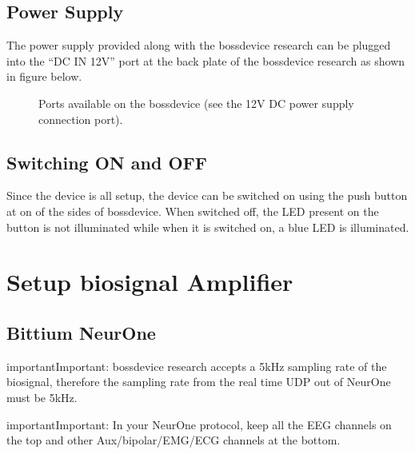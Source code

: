 \documentclass[letterpaper,10pt,english]{sphinxmanual}
\begin{document}
\section{Power Supply}
\label{\detokenize{2_setup_bossdevice_research:power-supply}}
The power supply provided along with the bossdevice research can be plugged into the “DC IN 12V” port at the back plate of the bossdevice research as shown in figure below.

\begin{figure}[htbp]
\centering
\capstart

\noindent{}
\caption{Ports available on the bossdevice (see the 12V DC power supply connection port).}\label{\detokenize{2_setup_bossdevice_research:id8}}\end{figure}


\section{Switching ON and OFF}
\label{\detokenize{2_setup_bossdevice_research:switching-on-and-off}}
Since the device is all setup, the device can be switched on using the push button at on of the sides of bossdevice. When switched off, the LED present on the button is not illuminated while when it is switched on, a blue LED is illuminated.


\chapter{Setup biosignal Amplifier}
\label{\detokenize{3_setup_biosignal_amplifier:setup-biosignal-amplifier}}\label{\detokenize{3_setup_biosignal_amplifier::doc}}

\section{Bittium NeurOne}
\label{\detokenize{3_setup_biosignal_amplifier:bittium-neurone}}
\begin{sphinxadmonition}{important}{Important:}
bossdevice research accepts a 5kHz sampling rate of the biosignal, therefore the sampling rate from the real time UDP out of NeurOne must be 5kHz.
\end{sphinxadmonition}

\begin{sphinxadmonition}{important}{Important:}
In your NeurOne protocol, keep all the EEG channels on the top and other Aux/bipolar/EMG/ECG channels at the bottom.
\end{sphinxadmonition}
\end{document}
